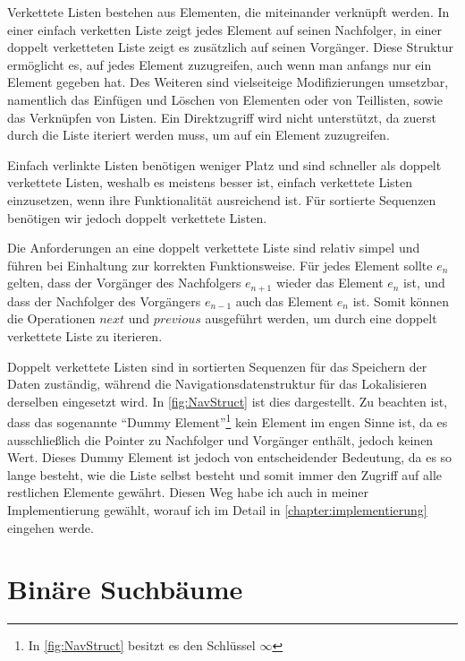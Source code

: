 Verkettete Listen bestehen aus Elementen, die miteinander verknüpft werden. In einer einfach verketten Liste zeigt jedes Element auf seinen Nachfolger, in einer doppelt verketteten Liste zeigt es zusätzlich auf seinen Vorgänger. Diese Struktur ermöglicht es, auf jedes Element zuzugreifen, auch wenn man anfangs nur ein Element gegeben hat. Des Weiteren sind vielseiteige Modifizierungen umsetzbar, namentlich das Einfügen und Löschen von Elementen oder von Teillisten, sowie das Verknüpfen von Listen. Ein Direktzugriff wird nicht unterstützt, da zuerst durch die Liste iteriert werden muss, um auf ein Element zuzugreifen.
\par
Einfach verlinkte Listen benötigen weniger Platz und sind schneller als doppelt verkettete Listen, weshalb es meistens besser ist, einfach verkettete Listen einzusetzen, wenn ihre Funktionalität ausreichend ist. Für sortierte Sequenzen benötigen wir jedoch doppelt verkettete Listen. \cite{Sanders:19}
\par
Die Anforderungen an eine doppelt verkettete Liste sind relativ simpel und führen bei Einhaltung zur korrekten Funktionsweise. Für jedes Element sollte $e_n$ gelten, dass der Vorgänger des Nachfolgers $e_{n+1}$ wieder das Element $e_n$ ist, und dass der Nachfolger des Vorgängers $e_{n-1}$ auch das Element $e_n$ ist. Somit können die Operationen $next$ und $previous$ ausgeführt werden, um durch eine doppelt verkettete Liste zu iterieren.\cite{Sanders:19}
\par
Doppelt verkettete Listen sind in sortierten Sequenzen für das Speichern der Daten zuständig, während die Navigationsdatenstruktur für das Lokalisieren derselben eingesetzt wird. In \autoref{fig:NavStruct} ist dies dargestellt. Zu beachten ist, dass das sogenannte "`Dummy Element"'\footnote{In \autoref{fig:NavStruct} besitzt es den Schlüssel $\infty$} kein Element im engen Sinne ist, da es ausschließlich die Pointer zu Nachfolger und Vorgänger enthält, jedoch keinen Wert. Dieses Dummy Element ist jedoch von entscheidender Bedeutung, da es so lange besteht, wie die Liste selbst besteht und somit immer den Zugriff auf alle restlichen Elemente gewährt. Diesen Weg habe ich auch in meiner Implementierung gewählt, worauf ich im Detail in \autoref{chapter:implementierung} eingehen werde.


\section{Binäre Suchbäume}
\label{section:binary-trees}

